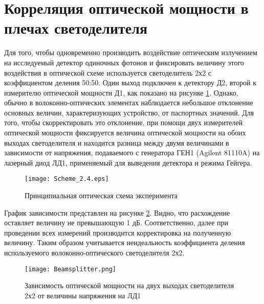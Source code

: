 %
%


\section{Корреляция оптической мощности в плечах светоделителя} \label{sec:ch2/sec4}


Для того, чтобы одновременно производить воздействие оптическим излучением на исследуемый детектор одиночных фотонов и фиксировать величину этого воздействия в оптической схеме используется светоделитель 2х2 с коэффициентом деления 50:50. Один выход подключен к детектору Д2, второй к измерителю оптической мощности Д1, как показано на рисунке \ref{fig:Scheme_2.4}. Однако, обычно в волоконно-оптических элементах наблюдается небольшое отклонение основных величин, характеризующих устройство, от паспортных значений. Для того, чтобы скорректировать это отклонение, при помощи двух измерителей оптической мощности фиксируется величина оптической мощности на обоих выходах светоделителя и находится разница между двумя величинами в зависимости от напряжения, подаваемого с генератора ГЕН1 (Agilent 81110A) на лазерный диод ЛД1, применяемый для выведения детектора и режима Гейгера.   

 \begin{figure}[ht]
  \centering
  \texttt{[image: Scheme\_2.4.eps]}
  \caption{Принципиальная оптическая схема эксперимента}
  \label{fig:Scheme_2.4}
\end{figure}


График зависимости представлен на рисунке \ref{fig:Beamsplitter}. Видно, что расхождение оставляет величину не превышающую 1 дБ. Соответственно, далее при проведении всех измерений производится корректировка на полученную величину. Таким образом учитывается неидеальность коэффициента деления используемого волоконно-оптического светоделителя 2х2. 


 \begin{figure}[ht]
  \centering
  \texttt{[image: Beamsplitter.png]}
  \caption{Зависимость оптической мощности на двух выходах светоделителя 2х2 от величины напряжения на ЛД1}
  \label{fig:Beamsplitter}
\end{figure}
\pagebreak


